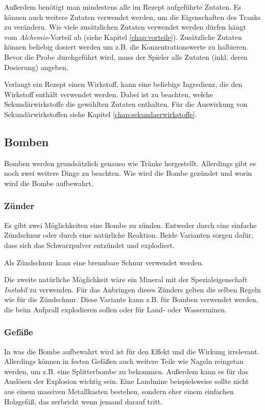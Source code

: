 Außerdem benötigt man mindestens alle im Rezept aufgeführte Zutaten. Es können auch weitere Zutaten verwendet werden, um die Eigenschaften des Tranks zu verändern. Wie viele zusätzlichen Zutaten verwendet werden dürfen hängt vom \textit{Alchemie}-Vorteil ab (siehe Kapitel \ref{chap:vorteile}). Zusätzliche Zutaten können beliebig dosiert werden um z.B. die Konzentrationswerte zu halbieren. Bevor die Probe durchgeführt wird, muss der Spieler alle Zutaten (inkl. deren Dosierung) angeben.

Verlangt ein Rezept einen Wirkstoff, kann eine beliebige Ingredienz, die den Wirkstoff enthält verwendet werden. Dabei ist zu beachten, welche Sekundärwirkstoffe die gewählten Zutaten enthalten. Für die Auswirkung von Sekundärwirkstoffen siehe Kapitel \ref{chap:sekundaerwirkstoffe}.

\subsection{Bomben}
Bomben werden grundsätzlich genauso wie Tränke hergestellt. Allerdings gibt es noch zwei weitere Dinge zu beachten. Wie wird die Bombe gezündet und worin wird die Bombe aufbewahrt.

\subsubsection{Zünder}
Es gibt zwei Möglichkeiten eine Bombe zu zünden. Entweder durch eine einfache Zündschnur oder durch eine natürliche Reaktion. Beide Varianten sorgen dafür, dass sich das Schwarzpulver entzündet und explodiert.

Als Zündschnur kann eine brennbare Schnur verwendet werden.

Die zweite natürliche Möglichkeit wäre ein Mineral mit der Spezialeigenschaft \textit{Instabil} zu verwenden. Für das Anbringen dieses Zünders gelten die selben Regeln wie für die Zündschnur. Diese Variante kann z.B. für Bomben verwendet werden, die beim Aufprall explodieren sollen oder für Land- oder Wasserminen.

\subsubsection{Gefäße}
In was die Bombe aufbewahrt wird ist für den Effekt und die Wirkung irrelevant. Allerdings können in festen Gefäßen auch weitere Teile wie Nageln reingetan werden, um z.B. eine Splitterbombe zu bekommen. Außerdem kann es für das Auslösen der Explosion wichtig sein. Eine Landmine beispielsweise sollte nicht aus einem massiven Metallkasten bestehen, sondern eher einem einfachen Holzgefäß, das zerbricht wenn jemand darauf tritt.

